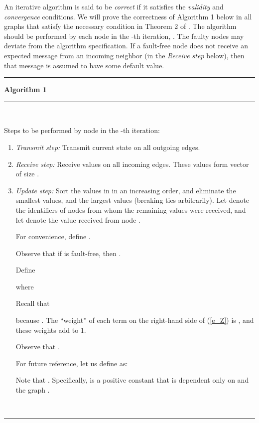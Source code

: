 \documentclass[letterpaper, 12pt]{article}
\begin{document}
An iterative algorithm is said to be {\em correct} if it satisfies
the {\em validity} and {\em convergence} conditions.
We will prove the correctness of Algorithm 1 below
 in all graphs that satisfy the
necessary condition in Theorem 2 of \cite{us}. The algorithm
should be performed by each node  in the
-th iteration, . The faulty nodes may deviate from the
algorithm specification. If a fault-free node does not receive an
expected message from an incoming neighbor (in the {\em Receive step}
below), then that message is assumed to have some default value.


\vspace*{8pt}\hrule

{\bf Algorithm 1}
\vspace*{4pt}\hrule

~

Steps to be performed by node  in the -th iteration:
\begin{enumerate}

\item {\em Transmit step:} Transmit current state  on all outgoing edges.
\item {\em Receive step:} Receive values on all incoming edges. These values form
vector  of size .


\item {\em Update step:}
Sort the values in  in an increasing order, and eliminate
the smallest  values, and the largest  values (breaking ties
arbitrarily).
 Let  denote the identifiers of nodes from
whom the remaining  values were received, and let
 denote the value received from node .

For convenience, define .

Observe that
if  is fault-free, then .

Define

where
 
Recall that
 
because .
The ``weight'' of each term on the right-hand side of
(\ref{e_Z}) is , and these weights add to 1.

Observe that .


For future reference, let us define  as:

Note that .
Specifically,  is a positive constant
that is dependent only on  and the graph .

\end{enumerate}

~
\hrule

~

~
\end{document}
